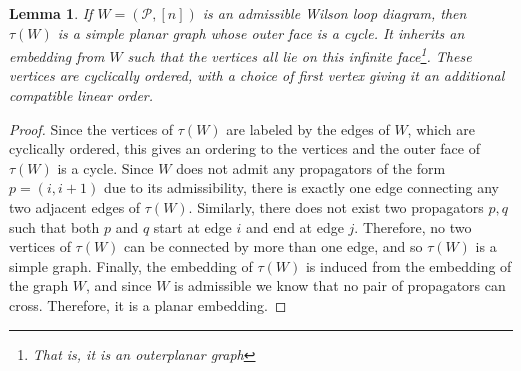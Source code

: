 \documentclass[11pt]{article}
\newcommand{\cP}{\mathcal{P}}
\newtheorem{lem}[thm]{Lemma}
\theoremstyle{remark}
\theoremstyle{definition}
\begin{document}
\begin{lem}\label{tausimpleplanarlem}
If $W = (\cP, [n])$ is an admissible Wilson loop diagram, then $\tau(W)$ is a simple planar graph whose outer face is a cycle. It inherits an embedding from $W$ such that the vertices all lie on this infinite face\footnote{That is, it is an \emph{outerplanar} graph}. These vertices are cyclically ordered, with a choice of first vertex giving it an additional compatible linear order.
\end{lem}

\begin{proof}
Since the vertices of $\tau(W)$ are labeled by the edges of $W$, which are cyclically ordered, this gives an ordering to the vertices and the outer face of $\tau(W)$ is a cycle.  Since $W$ does not admit any propagators of the form $p = (i, i+1)$ due to its admissibility, there is exactly one edge connecting any two adjacent edges of $\tau(W)$. Similarly, there does not exist two propagators $p,q$ such that both $p$ and $q$ start at edge $i$ and end at edge $j$. Therefore, no two vertices of $\tau(W)$ can be connected by more than one edge, and so $\tau(W)$ is a simple graph. Finally, the embedding of $\tau(W)$ is induced from the embedding of the graph $W$, and since $W$ is admissible we know that no pair of propagators can cross. Therefore, it is a planar embedding. 
 \end{proof}
\end{document}

